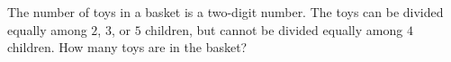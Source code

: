 The number of toys in a basket is a two-digit number. The toys can be divided equally among $2$, $3$, or $5$ children, but cannot be divided equally among $4$ children. How many toys are in the basket?
